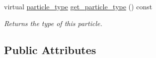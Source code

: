 \begin{DoxyCompactItemize}
\mbox{\label{classphysim_1_1particles_1_1base__particle_ac6aec0759a48d4337006aa41c280b8fc}} 
virtual \hyperlink{namespacephysim_1_1particles_a068e6cda6626fbd381c07a9835425b08}{particle\+\_\+type} \hyperlink{classphysim_1_1particles_1_1base__particle_ac6aec0759a48d4337006aa41c280b8fc}{get\+\_\+particle\+\_\+type} () const
\begin{DoxyCompactList}\small\item\em Returns the type of this particle. \end{DoxyCompactList}\end{DoxyCompactItemize}
\subsection*{Public Attributes}
